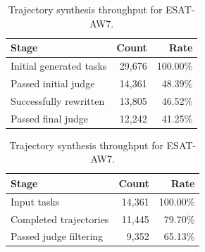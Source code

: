 \begin{table}[t]
\centering
\small
\begin{minipage}[t]{0.49\linewidth}
    \centering
    \begin{tabular}{lrr}
    \toprule
    \textbf{Stage} & \textbf{Count} & \textbf{Rate} \\
    \midrule
    Initial generated tasks & 29,676 & 100.00\% \\
    Passed initial judge & 14,361 & 48.39\% \\
    Successfully rewritten & 13,805 & 46.52\% \\
    Passed final judge & 12,242 & 41.25\% \\
    \bottomrule
    \end{tabular}
    \caption{Task synthesis throughput for \textsc{ESAT}-AW7.}
    \label{tab:task_synthesis_stats}
\end{minipage}
\hfill
\begin{minipage}[t]{0.49\linewidth}
    \centering
    \begin{tabular}{lrr}
    \toprule
    \textbf{Stage} & \textbf{Count} & \textbf{Rate} \\
    \midrule
    Input tasks & 14,361 & 100.00\% \\
    Completed trajectories & 11,445 & 79.70\% \\
    Passed judge filtering  & 9,352 & 65.13\% \\
    \bottomrule
    \end{tabular}
    \caption{Trajectory synthesis throughput for \textsc{ESAT}-AW7.}
    \label{tab:trajectory_stats}
\end{minipage}
\end{table}
